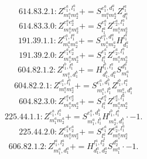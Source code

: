 \documentclass[letterpaper,10pt,fleqn,leqno,onecolumn]{article}
\begin{document}
\begin{equation} \;\;\;\;\;\;  614.83.2.1: Z^{e_{1}^{a},l_{1}^{a}}_{m_{1}^{a}m_{2}^{a}}+=S^{e_{1}^{a},d_{1}^{a}}_{m_{1}^{a}m_{2}^{a}}Z^{l_{1}^{a}}_{d_{1}^{a}} \end{equation}
\begin{equation} \;\;\;\;\;\;  614.83.3.0: Z^{e_{1}^{a}e_{2}^{a}}_{m_{1}^{a}m_{2}^{a}}+=S^{e_{1}^{a}}_{l_{1}^{a}}Z^{e_{2}^{a},l_{1}^{a}}_{m_{1}^{a}m_{2}^{a}} \end{equation}
\begin{equation} \;\;\;\;\;\;  191.39.1.1: Z^{e_{1}^{a},l_{1}^{a}}_{m_{1}^{a}m_{2}^{a}}+=S^{e_{1}^{a},d_{1}^{a}}_{m_{1}^{a}m_{2}^{a}}H^{l_{1}^{a}}_{d_{1}^{a}} \end{equation}
\begin{equation} \;\;\;\;\;\;  191.39.2.0: Z^{e_{1}^{a}e_{2}^{a}}_{m_{1}^{a}m_{2}^{a}}+=S^{e_{1}^{a}}_{l_{1}^{a}}Z^{e_{2}^{a},l_{1}^{a}}_{m_{1}^{a}m_{2}^{a}} \end{equation}
\begin{equation} \;\;\;\;\;\;  604.82.1.2: Z^{l_{1}^{b},l_{1}^{a}}_{m_{1}^{a},d_{1}^{b}}+=H^{l_{1}^{b},l_{1}^{a}}_{d_{1}^{b},d_{1}^{a}}S^{d_{1}^{a}}_{m_{1}^{a}} \end{equation}
\begin{equation} \;\;\;\;\;\;  604.82.2.1: Z^{e_{1}^{a},l_{1}^{a}}_{m_{1}^{a}m_{2}^{a}}+=S^{e_{1}^{a},d_{1}^{b}}_{m_{1}^{a},l_{1}^{b}}Z^{l_{1}^{b},l_{1}^{a}}_{m_{2}^{a},d_{1}^{b}} \end{equation}
\begin{equation} \;\;\;\;\;\;  604.82.3.0: Z^{e_{1}^{a}e_{2}^{a}}_{m_{1}^{a}m_{2}^{a}}+=S^{e_{1}^{a}}_{l_{1}^{a}}Z^{e_{2}^{a},l_{1}^{a}}_{m_{1}^{a}m_{2}^{a}} \end{equation}
\begin{equation} \;\;\;\;\;\;  225.44.1.1: Z^{e_{1}^{a},l_{1}^{a}}_{m_{1}^{a}m_{2}^{a}}+=S^{e_{1}^{a},d_{1}^{b}}_{m_{1}^{a},l_{1}^{b}}H^{l_{1}^{b},l_{1}^{a}}_{m_{2}^{a},d_{1}^{b}}\cdot -1. \end{equation}
\begin{equation} \;\;\;\;\;\;  225.44.2.0: Z^{e_{1}^{a}e_{2}^{a}}_{m_{1}^{a}m_{2}^{a}}+=S^{e_{1}^{a}}_{l_{1}^{a}}Z^{e_{2}^{a},l_{1}^{a}}_{m_{1}^{a}m_{2}^{a}} \end{equation}
\begin{equation} \;\;\;\;\;\;  606.82.1.2: Z^{l_{1}^{a},l_{2}^{a}}_{m_{1}^{a},d_{1}^{a}}+=H^{l_{1}^{a},l_{2}^{a}}_{d_{1}^{a},d_{2}^{a}}S^{d_{2}^{a}}_{m_{1}^{a}}\cdot -1. \end{equation}
\end{document}
